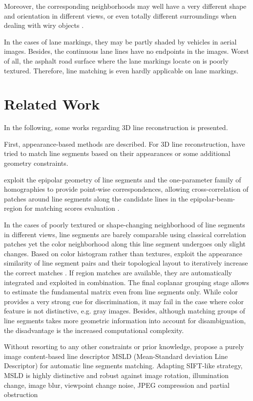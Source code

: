 Moreover, the corresponding neighborhoods may well have a very different shape and orientation in different views, or even totally different surroundings when dealing with wiry objects \cite{HoferFeb2013}.

In the cases of lane markings, they may be partly shaded by vehicles in aerial images. Besides, the continuous lane lines have no endpoints in the images. Worst of all, the asphalt road surface where the lane markings locate on is poorly textured. Therefore, line matching is even hardly applicable on lane markings.

\section{Related Work}
In the following, some works regarding 3D line reconstruction is presented.

First, appearance-based methods are described. For 3D line reconstruction, \cite{SchmidJun1997,BayJun2005,WangMay2009} have tried to match line segments based on their appearances or some additional geometry constraints.

\citeauthor{SchmidJun1997} exploit the epipolar geometry of line segments and the one-parameter family of homographies to provide point-wise correspondences, allowing cross-correlation of patches around line segments along the candidate lines in the epipolar-beam-region for matching scores evaluation \cite{SchmidJun1997}.

In the cases of poorly textured or shape-changing neighborhood of line segments in different views, line segments are barely comparable using classical correlation patches yet the color neighborhood along this line segment undergoes only slight changes. Based on color histogram rather than textures, \citeauthor{BayJun2005} exploit the appearance similarity of line segment pairs and their topological layout to iteratively increase the correct matches \cite{BayJun2005}. If region matches are available, they are automatically integrated and exploited in combination. The final coplanar grouping stage allows to estimate the fundamental matrix even from line segments only. While color provides a very strong cue for discrimination, it may fail in the case where color feature is not distinctive, e.g. gray images. Besides, although matching groups of line segments takes more geometric information into account for disambiguation, the disadvantage is the increased computational complexity.

Without resorting to any other constraints or prior knowledge, \citeauthor{WangMay2009} propose a purely image content-based line descriptor MSLD (Mean-Standard deviation Line Descriptor) for automatic line segments matching. Adapting SIFT-like strategy, MSLD is highly distinctive and robust against image rotation, illumination change, image blur, viewpoint change noise, JPEG compression and partial obstruction \cite{WangMay2009}

